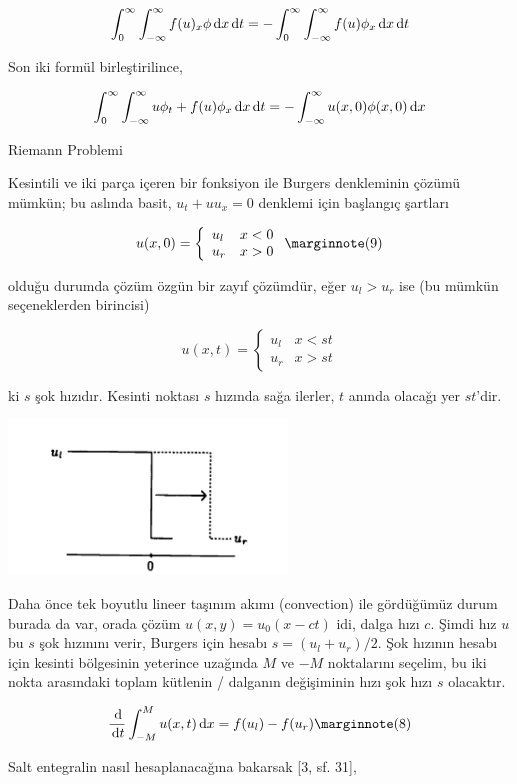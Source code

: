 \documentclass[12pt,fleqn]{article}\usepackage{../../common}
\begin{document}
$$
\int_{0}^{\infty} \int_{-\infty}^{\infty}
f(u)_x \phi \,\mathrm{d} x \,\mathrm{d} t =
- \int_{0}^{\infty} \int_{-\infty}^{\infty} f(u) \phi_x \,\mathrm{d} x \,\mathrm{d} t
$$

Son iki formül birleştirilince,

$$
\int_{0}^{\infty} \int_{-\infty}^{\infty}
u \phi_t + f(u) \phi_x \,\mathrm{d} x \,\mathrm{d} t = -
\int_{-\infty}^{\infty} u(x,0) \phi(x,0) \,\mathrm{d} x 
$$

Riemann Problemi

Kesintili ve iki parça içeren bir fonksiyon ile Burgers denkleminin çözümü
mümkün; bu aslında basit, $u_t + u u_x = 0$ denklemi için başlangıç şartları

$$
u(x,0) = 
\left\{ \begin{array}{ll}
u_l & x < 0 \\
u_r & x > 0 
\end{array} \right.
\mlabel{9}
$$

olduğu durumda çözüm özgün bir zayıf çözümdür, eğer $u_l > u_r$ ise (bu mümkün
seçeneklerden birincisi)

$$
u(x,t) = 
\left\{ \begin{array}{ll}
u_l & x < st \\
u_r & x > st 
\end{array} \right.
$$

ki $s$ şok hızıdır. Kesinti noktası $s$ hızında sağa ilerler, $t$ anında olacağı
yer $st$'dir. 

\includegraphics[width=20em]{compscieng_bpp50fv1_01.png}

Daha önce tek boyutlu lineer taşınım akımı (convection) ile gördüğümüz durum
burada da var, orada çözüm $u(x,y) = u_0(x-ct)$ idi, dalga hızı $c$. Şimdi hız
$u$ bu $s$ şok hızınını verir, Burgers için hesabı $s = (u_l + u_r) / 2$.  Şok
hızının hesabı için kesinti bölgesinin yeterince uzağında $M$ ve $-M$ noktalarını
seçelim, bu iki nokta arasındaki toplam kütlenin / dalganın değişiminin hızı şok
hızı $s$ olacaktır.

$$
\frac{\ud}{\ud t} \int_{-M}^{M} u(x,t) \ud x = f(u_l) - f(u_r)
\mlabel{8}
$$

Salt entegralin nasıl hesaplanacağına bakarsak [3, sf. 31],
\end{document}
